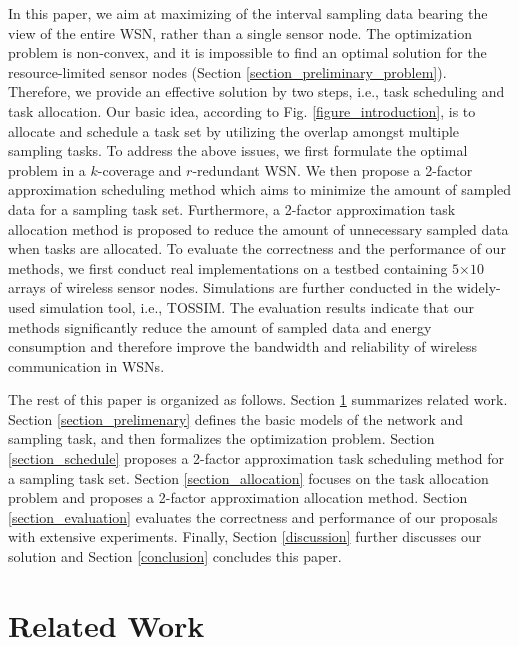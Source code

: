 \documentclass[prodmode,acmtosn]{acmsmall}
\begin{document}
In this paper, we aim at maximizing of  the interval sampling data bearing the view of the entire WSN, rather than a single sensor node. The optimization problem is non-convex, and it is impossible to find an optimal solution for the resource-limited sensor nodes (Section \ref{section_preliminary_problem}). Therefore, we provide an effective solution by two steps, i.e., task scheduling and task allocation. Our basic idea, according to Fig. \ref{figure_introduction}, is to allocate and schedule a task set by utilizing the overlap amongst multiple sampling tasks. To address the above issues, we first formulate the optimal problem in a $k$-coverage and $r$-redundant WSN. We then propose a 2-factor approximation scheduling method which aims to minimize the amount of sampled data for a sampling task set. Furthermore, a 2-factor approximation task allocation method is proposed to reduce the amount of unnecessary sampled  data when tasks are allocated. To evaluate the correctness and the performance of our methods, we first conduct real implementations on a testbed containing  $5\mathrm{\times}10$ arrays of wireless sensor nodes. Simulations are further conducted in the widely-used simulation tool, i.e., TOSSIM. The evaluation results indicate that our methods significantly
reduce the amount of sampled data and energy consumption and therefore improve the bandwidth and reliability of wireless communication in WSNs.

The rest of this paper is organized as follows. Section \ref{section_related_work} summarizes related work. Section
\ref{section_prelimenary} defines the basic models of the network and sampling task, and then formalizes the optimization problem.  Section \ref{section_schedule} proposes a 2-factor approximation task  scheduling method for a sampling task set.  Section \ref{section_allocation} focuses on the task allocation problem and proposes a 2-factor approximation allocation method. Section \ref{section_evaluation} evaluates the correctness and performance of our proposals with extensive experiments. Finally, Section \ref{discussion} further discusses our solution and Section \ref{conclusion} concludes this paper.

\section{Related Work}
\label{section_related_work}
\end{document}
